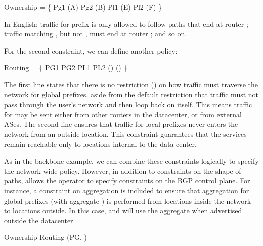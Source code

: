 
\begin{code}
\Define Ownership = \{
    Pg1 \Path \End(A)
    Pg2 \Path \End(B)
    Pl1 \Path \End(E)
    Pl2 \Path \End(F)
\}
\end{code}
\noindent
In English: traffic for prefix  is only allowed to follow paths that
end at router ; traffic matching ,
but not , must
end at router ; and so on.

For the second constraint, we can define another policy:

\begin{code}
\Define Routing = \{
    PG1 \OR PG2 \Path \Any
    PL1 \OR PL2 \Path \NOT{}\Enter(\Out)
    \True      \Path \Exit(\Out)
\}
\end{code}
\noindent
The first line states that there is no restriction (\Any)
on how traffic must
traverse the network for global prefixes, aside from the default restriction
that traffic must not pass through the user's network and then loop
back on itself. This means traffic for
 may be sent either from other routers in the datacenter, or
from external ASes. The second line ensures that traffic for local
prefixes never enters the network from an outside location. This constraint
guarantees that the services remain reachable only to locations
internal to the data center.

As in the backbone example, we can combine these constraints
logically to specify the network-wide policy.
However, in addition to constraints on the shape of paths,
\sysname allows the operator to specify constraints on the BGP control plane.
For instance, a constraint on aggregation is included to ensure that
aggregation for global prefixes (with aggregate ) is performed from
locations inside the network to locations outside. In this case,  and  will use the aggregate  when advertised outside the datacenter.

\begin{code}
Ownership \AND{} Routing \AND{} \Agg(PG, \In \Link \Out)
\end{code}

